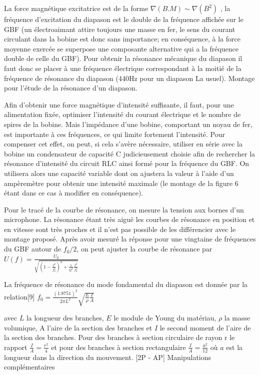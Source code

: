 \documentclass{article}%
\begin{document}
La force magnétique excitatrice est de la forme $\nabla (B.M) \sim \nabla (B^2)$ , la fréquence d'excitation du diapason est le double de la fréquence affichée sur le GBF (un électroaimant attire toujours une masse en fer, le sens du courant circulant dans la bobine est donc sans importance; en conséquence, à la force moyenne exercée se superpose une composante alternative qui a la fréquence double de celle du GBF). Pour obtenir la résonance mécanique du diapason il faut donc se placer à une fréquence électrique correspondant à la moitié de la fréquence de résonance du diapason (440Hz pour un diapason La usuel).
Montage pour l'étude de la résonance d'un diapason.

Afin d'obtenir une force magnétique d'intensité suffisante, il faut, pour une alimentation fixée, optimiser l'intensité du courant électrique et le nombre de spires de la bobine. Mais l'impédance d'une bobine, comportant un noyau de fer, est importante à ces fréquences, ce qui limite fortement l'intensité. Pour compenser cet effet, on peut, si cela s'avère nécessaire, utiliser en série avec la bobine un condensateur de capacité C judicieusement choisie afin de rechercher la résonance d'intensité du circuit RLC ainsi formé pour la fréquence du GBF. On utilisera alors une capacité variable dont on ajustera la valeur à l'aide d'un ampèremètre pour obtenir une intensité maximale (le montage de la figure 6 étant dans ce cas à modifier en conséquence).

Pour le tracé de la courbe de résonance, on mesure la tension aux bornes d'un microphone. La résonance étant très aiguë les courbes de résonance en position et en vitesse sont très proches et il n'est pas possible de les différencier avec le montage proposé. Après avoir mesuré la réponse pour une vingtaine de fréquences du GBF autour de $f_0/2$, on peut ajuster la courbe de résonance par
$ U(f)=\frac{U_0}{\sqrt{\left(1-\frac{f^2}{f_0^2}\right)^2+\frac{1}{Q^2}\frac{f^2}{f_0^2}}}$

La fréquence de résonance du mode fondamental du diapason est donnée par la relation[9]
$ f_0=\frac{(1.8751)^2}{2\pi L^2}\sqrt{\frac{E}{\rho}\frac{I}{A}}$

avec $L$ la longueur des branches, $E$ le module de Young du matériau, $\rho$ la masse volumique, A l'aire de la section des branches et $I$ le second moment de l'aire de la section des branches. Pour des branches à section circulaire de rayon r le rapport $\frac{I}{A}=\frac{r^2}{4}$ et pour des branches à section rectangulaire $\frac{I}{A}=\frac{a^2}{12}$ où $a$ est la longueur dans la direction du mouvement.
[2P - AP] Manipulations complémentaires
\end{document}
